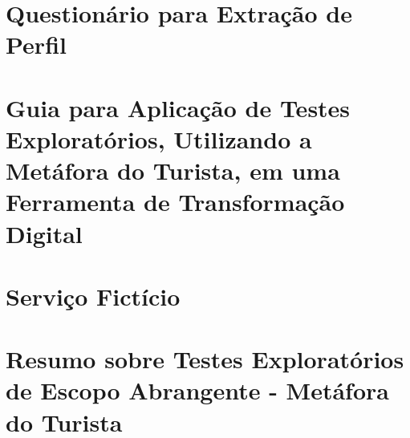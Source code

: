 \begin{anexosenv}
\partanexos

\chapter{Questionário para Extração de Perfil}\label{anexo:questionario}



\chapter{Guia para Aplicação de Testes Exploratórios, Utilizando a Metáfora do Turista, em uma Ferramenta de Transformação Digital}\label{anexo:guiaTestesExploratorios}



\chapter{Serviço Fictício}\label{anexo:servicoFicticio}



\chapter{Resumo sobre Testes Exploratórios de Escopo Abrangente - Metáfora do Turista}\label{anexo:resumoTours}




\end{anexosenv}

